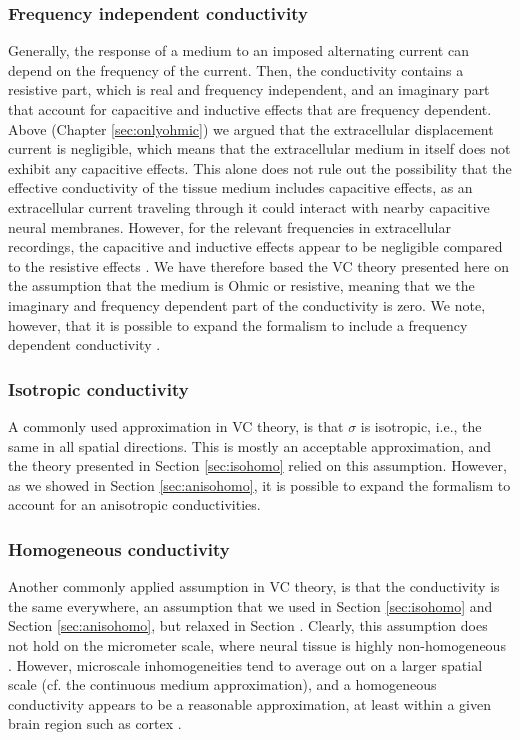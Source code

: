 \subsubsection{Frequency independent conductivity} 
\label{sec:f-independent}
Generally, the response of a medium to an imposed alternating current can depend on the frequency of the current. Then, the conductivity contains a resistive part, which is real and frequency independent, and an imaginary part that account for capacitive and inductive effects that are frequency dependent. Above (Chapter \ref{sec:onlyohmic}) we argued that the extracellular displacement current is negligible, which means that the extracellular medium in itself does not exhibit any capacitive effects. This alone does not rule out the possibility that the effective conductivity of the tissue medium includes capacitive effects, as an extracellular current traveling through it could interact with nearby capacitive neural membranes. However, for the relevant frequencies in extracellular recordings, the capacitive and inductive effects appear to be negligible compared to the resistive effects \cite{Logothetis2007, Miceli2017, Ranta2017}. We have therefore based the VC theory presented here on the assumption that the medium is Ohmic or resistive, meaning that we the imaginary and frequency dependent part of the conductivity is zero. We note, however, that it is possible to expand the formalism to include a frequency dependent conductivity \cite{Bedard2004, Tracey2011, Miceli2017}. 


\subsubsection{Isotropic conductivity} 
A commonly used approximation in VC theory, is that $\sigma$ is isotropic, i.e., the same in all spatial directions. This is mostly an acceptable approximation, and the theory presented in Section \ref{sec:isohomo} relied on this assumption. However, as we showed in Section \ref{sec:anisohomo}, it is possible to expand the formalism to account for an anisotropic conductivities.


\subsubsection{Homogeneous conductivity} 
Another commonly applied assumption in VC theory, is that the conductivity is the same everywhere, an assumption that we used in Section \ref{sec:isohomo} and Section \ref{sec:anisohomo}, but relaxed in Section \label{sec:nonhomo}. Clearly, this assumption does not hold on the micrometer scale, where neural tissue is highly non-homogeneous \citep{Nicholson1998}. However, microscale inhomogeneities tend to average out on a larger spatial scale (cf. the continuous medium approximation), and a homogeneous conductivity appears to be a reasonable approximation, at least within a given brain region such as cortex \citep{Logothetis2007}. 

